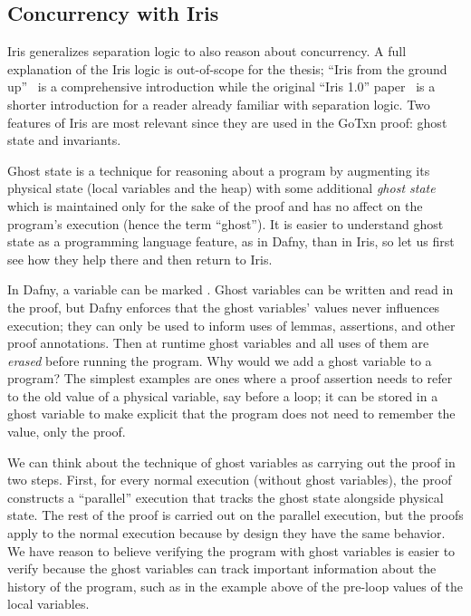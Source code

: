 
\subsection{Concurrency with Iris}

Iris generalizes separation logic to also reason about concurrency. A full
explanation of the Iris logic is out-of-scope for the thesis; ``Iris from the
ground up''~\cite{jung:iris-jfp} is a comprehensive introduction while the
original ``Iris 1.0'' paper~\cite{jung:iris-1} is a shorter introduction for a
reader already familiar with separation logic. Two features of Iris are most
relevant since they are used in the GoTxn proof: ghost state and invariants.

Ghost state is a technique for reasoning about a program by augmenting its
physical state (local variables and the heap) with some additional \emph{ghost
state} which is maintained only for the sake of the proof and has no affect on
the program's execution (hence the term ``ghost''). It is easier to understand
ghost state as a programming language feature, as in Dafny, than in Iris, so let
us first see how they help there and then return to Iris.

In Dafny, a variable can be marked . Ghost variables can be written
and read in the proof, but Dafny enforces that the ghost variables' values never
influences execution; they can only be used to inform uses of lemmas,
assertions, and other proof annotations. Then at runtime ghost variables and all
uses of them are \emph{erased} before running the program. Why would we add a
ghost variable to a program? The simplest examples are ones where a proof
assertion needs to refer to the old value of a physical variable, say before a
loop; it can be stored in a ghost variable to make explicit that the program
does not need to remember the value, only the proof.


We can think about the technique of ghost variables as carrying out the proof in
two steps. First, for every normal execution (without ghost variables), the
proof constructs a ``parallel'' execution that tracks the ghost state alongside
physical state. The rest of the proof is carried out on the parallel execution,
but the proofs apply to the normal execution because by design they have the
same behavior. We have reason to believe verifying the program with ghost
variables is easier to verify because the ghost variables can track important
information about the history of the program, such as in the example above of
the pre-loop values of the local variables.

